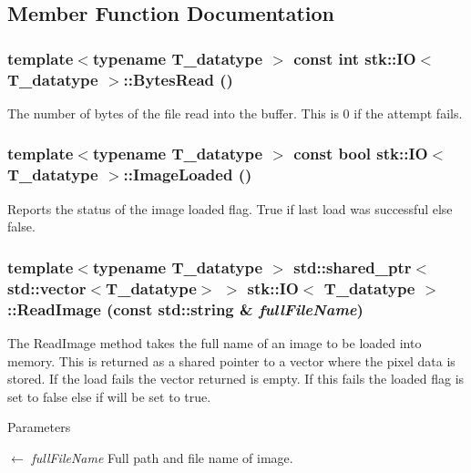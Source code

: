 \subsection{Member Function Documentation}
\hypertarget{classstk_1_1IO_a8bd433a5700222e3e8505984f572d124}{
\subsubsection[{BytesRead}]{\setlength{\rightskip}{0pt plus 5cm}template$<$typename T\_\-datatype $>$ const int {\bf stk::IO}$<$ T\_\-datatype $>$::BytesRead ()}}
\label{classstk_1_1IO_a8bd433a5700222e3e8505984f572d124}
The number of bytes of the file read into the buffer. This is 0 if the attempt fails. \hypertarget{classstk_1_1IO_aa99e99b11bfad3119268ea65d593d032}{
\subsubsection[{ImageLoaded}]{\setlength{\rightskip}{0pt plus 5cm}template$<$typename T\_\-datatype $>$ const bool {\bf stk::IO}$<$ T\_\-datatype $>$::ImageLoaded ()}}
\label{classstk_1_1IO_aa99e99b11bfad3119268ea65d593d032}
Reports the status of the image loaded flag. True if last load was successful else false. \hypertarget{classstk_1_1IO_a5cc5f494be8ac294efb38b96e4fc3742}{
\subsubsection[{ReadImage}]{\setlength{\rightskip}{0pt plus 5cm}template$<$typename T\_\-datatype $>$ std::shared\_\-ptr$<$ std::vector$<$T\_\-datatype$>$ $>$ {\bf stk::IO}$<$ T\_\-datatype $>$::ReadImage (const std::string \& {\em fullFileName})}}
\label{classstk_1_1IO_a5cc5f494be8ac294efb38b96e4fc3742}
The ReadImage method takes the full name of an image to be loaded into memory. This is returned as a shared pointer to a vector where the pixel data is stored. If the load fails the vector returned is empty. If this fails the loaded flag is set to false else if will be set to true. 
\begin{DoxyParams}{Parameters}
\item[\mbox{$\leftarrow$} {\em fullFileName}]Full path and file name of image. \end{DoxyParams}
